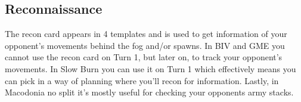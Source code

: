 \subsection{Reconnaissance}

The recon card appears in 4 templates and is used to get information of your opponent's movements behind the fog and/or spawns. In BIV and GME you cannot use the recon card on Turn 1, but later on, to track your opponent's movements. In Slow Burn you can use it on Turn 1 which effectively means you can pick in a way of planning where you'll recon for information. Lastly, in Macodonia no split it's mostly useful for checking your opponents army stacks.